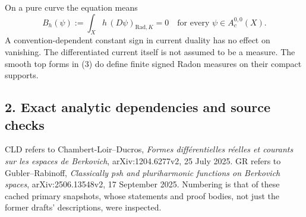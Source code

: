 \documentclass[11pt]{article}
\begin{document}
On a pure curve the equation means \[
 B_h(\psi):=\int_X h\,(D\psi)_{\mathrm{Rad},K}=0
          \quad\text{for every }\psi\in A_c^{0,0}(X).     \tag{3}
\] A convention-dependent constant sign in current duality has no effect
on vanishing. The differentiated current itself is not assumed to be a
measure. The smooth top forms in (3) do define finite signed Radon
measures on their compact supports.

\subsection{2. Exact analytic dependencies and source
checks}\label{exact-analytic-dependencies-and-source-checks}

CLD refers to Chambert-Loir--Ducros, \emph{Formes différentielles
réelles et courants sur les espaces de Berkovich}, arXiv:1204.6277v2, 25
July 2025. GR refers to Gubler--Rabinoff, \emph{Classically psh and
pluriharmonic functions on Berkovich spaces}, arXiv:2506.13548v2, 17
September 2025. Numbering is that of these cached primary snapshots,
whose statements and proof bodies, not just the former drafts'
descriptions, were inspected.
\end{document}
